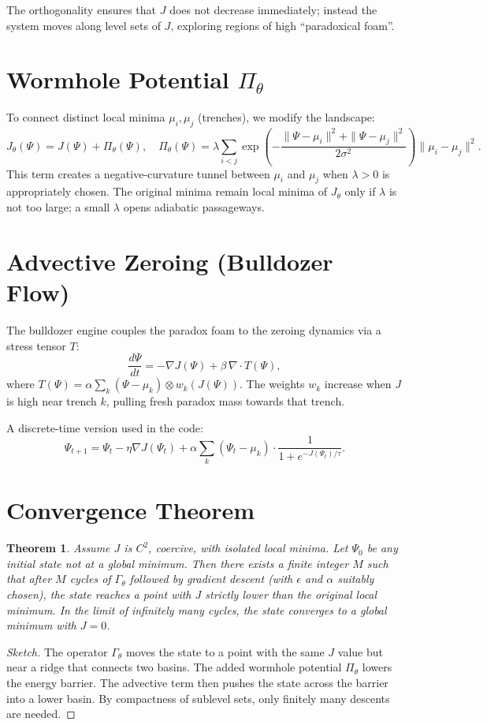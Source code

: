 \documentclass[12pt]{article}
\newtheorem{theorem}{Theorem}
\begin{document}
The orthogonality ensures that $J$ does not decrease immediately; instead the system moves along level sets of $J$, exploring regions of high ``paradoxical foam''.

\section{Wormhole Potential $\Pi_\theta$}
To connect distinct local minima $\mu_i, \mu_j$ (trenches), we modify the landscape:
\begin{equation}
J_\theta(\Psi) = J(\Psi) + \Pi_\theta(\Psi),
\quad
\Pi_\theta(\Psi) = \lambda \sum_{i<j} \exp\!\left(-\frac{\|\Psi-\mu_i\|^2+\|\Psi-\mu_j\|^2}{2\sigma^2}\right) \|\mu_i-\mu_j\|^2.
\end{equation}
This term creates a negative-curvature tunnel between $\mu_i$ and $\mu_j$ when $\lambda>0$ is appropriately chosen. The original minima remain local minima of $J_\theta$ only if $\lambda$ is not too large; a small $\lambda$ opens adiabatic passageways.

\section{Advective Zeroing (Bulldozer Flow)}
The bulldozer engine couples the paradox foam to the zeroing dynamics via a stress tensor $T$:
\begin{equation}
\frac{d\Psi}{dt} = -\nabla J(\Psi) + \beta\,\nabla \cdot T(\Psi),
\end{equation}
where $T(\Psi) = \alpha \sum_k (\Psi - \mu_k) \otimes w_k(J(\Psi))$. The weights $w_k$ increase when $J$ is high near trench $k$, pulling fresh paradox mass towards that trench.

A discrete-time version used in the code:
\[
\Psi_{t+1} = \Psi_t - \eta \nabla J(\Psi_t) + \alpha \sum_k (\Psi_t - \mu_k) \cdot \frac{1}{1 + e^{-J(\Psi_t)/\tau}}.
\]

\section{Convergence Theorem}
\begin{theorem}
Assume $J$ is $C^2$, coercive, with isolated local minima. Let $\Psi_0$ be any initial state not at a global minimum. Then there exists a finite integer $M$ such that after $M$ cycles of $\Gamma_\theta$ followed by gradient descent (with $\epsilon$ and $\alpha$ suitably chosen), the state reaches a point with $J$ strictly lower than the original local minimum. In the limit of infinitely many cycles, the state converges to a global minimum with $J=0$.
\end{theorem}
\begin{proof}[Sketch]
The operator $\Gamma_\theta$ moves the state to a point with the same $J$ value but near a ridge that connects two basins. The added wormhole potential $\Pi_\theta$ lowers the energy barrier. The advective term then pushes the state across the barrier into a lower basin. By compactness of sublevel sets, only finitely many descents are needed.
\end{proof}
\end{document}
